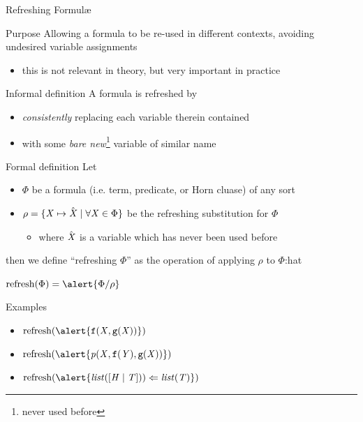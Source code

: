 \documentclass[presentation]{beamer}\mode<presentation>{\usetheme{AMSBolognaFC}}
\begin{document}
\begin{frame}[allowframebreaks]{Refreshing Formul\ae{}}
    \begin{block}{Purpose}
        Allowing a formula to be re-used in different contexts, avoiding undesired variable assignments 
        \begin{itemize}
            \item this is not relevant in theory, but very important in practice
        \end{itemize}
    \end{block}
    \begin{block}{Informal definition}
        A formula is \alert{refreshed} by 
        \begin{itemize}
            \item \emph{consistently} replacing each variable therein contained
            \item with some \emph{bare new}\footnote{never used before} variable of similar name 
        \end{itemize}
    \end{block}
    \begin{alertblock}{Formal definition}
        Let 
        \begin{itemize}
            \item \alert{$\Phi$} be a formula (i.e. term, predicate, or Horn cluase) of any sort 
            \item \alert{$\rho = \{ \mathit{X} \mapsto \hat{\mathit{X}} \mid \forall \mathit{X} \in \Phi \}$} be the refreshing substitution for $\Phi$
            \begin{itemize}\small
                \item where $\hat{\mathit{X}}$ is a variable which has \alert{never been used before}
            \end{itemize} 
        \end{itemize}
        then we define ``refreshing $\Phi$'' as the operation of applying $\rho$ to $\Phi$:hat
        \begin{center}
            $ \text{refresh}(\Phi) = \alert{\Phi / \rho} $
        \end{center}
    \end{alertblock}

    \begin{exampleblock}{Examples}
        \begin{multicols}{2}\small
            \begin{itemize}
                \item $\text{refresh}(\alert{\functor{f}(\variable{X}, \functor{g}(\variable{X}))})$ 
                \item $\text{refresh}(\alert{\predication{p}(\variable{X}, \functor{f}(\variable{Y}), \functor{g}(\variable{X}))})$ 
                \item $\text{refresh}(\alert{\predication{list}([\variable{H} \mid \variable{T} ])) \Leftarrow \predication{list}(\variable{T})})$ 
                

\end{itemize}
\end{multicols}
\end{exampleblock}
\end{frame}
\end{document}
